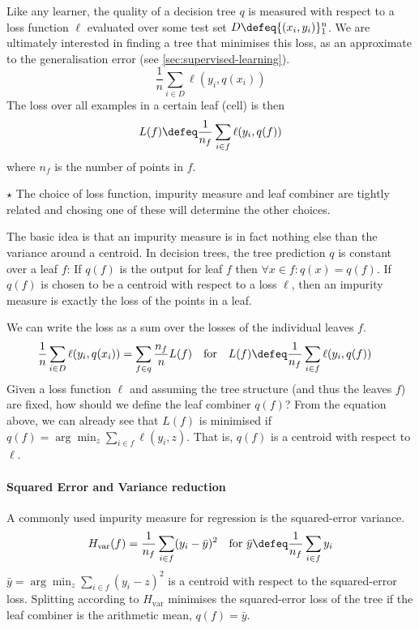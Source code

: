 \documentclass[../main.tex]{subfiles}
\begin{document}
Like any learner, the quality of a decision tree $q$ is measured with respect to a loss function $\ell$ evaluated over some test set $D \defeq \{ (x_{i}, y_{i}) \}_{1}^n$. We are ultimately interested in finding a tree that minimises this loss, as an approximate to the generalisation error (see \cref{sec:supervised-learning}).
$$
\frac{1}{n} \sum_{i \in D} \ell(y_{i}, q(x_{i}))
$$
The loss over all examples in a certain leaf (cell) is then 
$$L(f) \defeq \frac{1}{n_{f}} \sum_{i \in f} \ell(y_{i}, q(f))$$ where $n_{f}$ is the number of points in $f$.

\begin{proposition} $\star$
    \label{thm:decision-trees-impurity}
The choice of loss function, impurity measure and leaf combiner are tightly related and chosing one of these will determine the other choices.
\end{proposition}
The basic idea is that an impurity measure is in fact nothing else than the variance around a centroid. In decision trees,  the tree prediction $q$ is constant over a leaf $f$: If $q(f)$ is the output for leaf $f$ then $\forall x \in f: q(x) = q(f)$. If $q(f)$ is chosen to be a centroid with respect to a loss $\ell$, then an impurity measure is exactly the loss of the points in a leaf.

We can write the loss as a sum over the losses of the individual leaves $f$.
\begin{align*}
\frac{1}{n} \sum_{i\in D}  \ell(y_{i}, q(x_{i})) &= \sum_{f \in q} \frac{n_{f}}{n}  
L(f) 
\hspace{1em} \text{for~~ } L(f) \defeq \frac{1}{n_{f}} \sum_{i \in f} \ell(y_{i}, q(f))
\end{align*}
Given a loss function $\ell$ and assuming the tree structure (and thus the leaves $f$) are fixed, how should we define the leaf combiner $q(f)$? From the equation above, we can already see that $L(f)$ is minimised if $q(f) = \arg\min_{z} \sum_{i \in f} \ell(y_{i}, z)$. That is, $q(f)$ is a centroid with respect to $\ell$.
\paragraph{Squared Error and Variance reduction} A commonly used impurity measure for regression is the squared-error variance.
$$
H_{\text{var} }(f) = \frac{1}{n_{f}} \sum_{i\in f} (y_{i} - \bar{y})^2 \hspace{1em} \text{for~} \bar{y} \defeq \frac{1}{n_{f}} \sum_{i \in f} y_{i}
$$
$\bar{y} = \arg\min_{z} \sum_{i \in f} (y_{i} - z)^2$ is a centroid with respect to the squared-error loss.
Splitting according to $H_{\text{var}}$ minimises the squared-error loss of the tree if the leaf combiner is the arithmetic mean, $q(f) = \bar{y}$.
\end{document}
